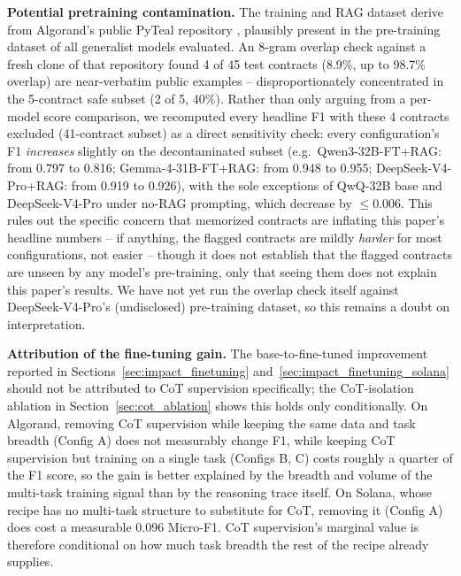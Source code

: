 \documentclass[lettersize,journal]{IEEEtran}
\begin{document}
\textbf{Potential pretraining contamination.} The training and RAG dataset derive from Algorand's
public PyTeal repository \cite{algorand_pyteal_github}, plausibly present in the pre-training
dataset of all generalist models evaluated. An 8-gram overlap check against a fresh clone of that
repository found 4 of 45 test contracts (8.9\%, up to 98.7\% overlap) are near-verbatim public
examples -- disproportionately concentrated in the 5-contract safe subset (2 of 5, 40\%). Rather
than only arguing from a per-model score comparison, we recomputed every headline F1 with these 4
contracts excluded (41-contract subset) as a direct sensitivity check: every configuration's F1
\emph{increases} slightly on the decontaminated subset (e.g.\ Qwen3-32B-FT+RAG:
from 0.797 to 0.816; Gemma-4-31B-FT+RAG: from 0.948 to 0.955; DeepSeek-V4-Pro+RAG:
from 0.919 to 0.926), with the sole exceptions of QwQ-32B base and DeepSeek-V4-Pro under no-RAG
prompting, which decrease by $\le$0.006. This rules out the specific concern that memorized
contracts are inflating this paper's headline numbers -- if anything, the flagged contracts are
mildly \emph{harder} for most configurations, not easier -- though it does not establish that the
flagged contracts are unseen by any model's pre-training, only that seeing them does not explain
this paper's results. We have not yet run the overlap check itself against DeepSeek-V4-Pro's
(undisclosed) pre-training dataset, so this remains a doubt on interpretation.

\textbf{Attribution of the fine-tuning gain.} The base-to-fine-tuned improvement reported in
Sections~\ref{sec:impact_finetuning} and~\ref{sec:impact_finetuning_solana} should not be attributed
to CoT supervision specifically; the CoT-isolation ablation in
Section~\ref{sec:cot_ablation} shows this holds only conditionally. On Algorand, removing CoT
supervision while keeping the same data and task breadth (Config A) does not measurably change F1,
while keeping CoT supervision but training on a single task (Configs B, C) costs roughly a quarter
of the F1 score, so the gain is better explained by the breadth and volume of the multi-task
training signal than by the reasoning trace itself. On Solana, whose recipe has no multi-task
structure to substitute for CoT, removing it (Config A) does cost a measurable 0.096 Micro-F1. CoT
supervision's marginal value is therefore conditional on how much task breadth the rest of the
recipe already supplies.
\end{document}
